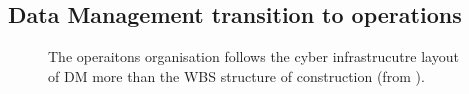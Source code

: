 \subsection{ Data Management transition to operations} \label{sec:transition}

\begin{figure}
\caption{ The operaitons organisation follows the cyber infrastrucutre layout of DM more than the WBS structure of construction (from \cite{RTN-046}).  \label{fig:opsorg}}
\end{figure}

